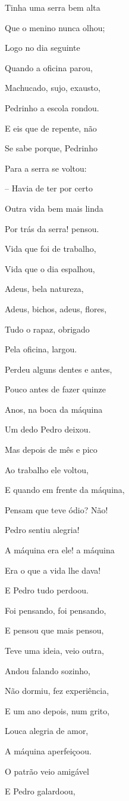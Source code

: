 Tinha uma serra bem alta

Que o menino nunca olhou;

Logo no dia seguinte

Quando a oficina parou,

Machucado, sujo, exausto,

Pedrinho a escola rondou.

E eis que de repente, não

Se sabe porque, Pedrinho

Para a serra se voltou:

-- Havia de ter por certo

Outra vida bem mais linda

Por trás da serra! pensou.

Vida que foi de trabalho,

Vida que o dia espalhou,

Adeus, bela natureza,

Adeus, bichos, adeus, flores,

Tudo o rapaz, obrigado

Pela oficina, largou.

Perdeu alguns dentes e antes,

Pouco antes de fazer quinze

Anos, na boca da máquina

Um dedo Pedro deixou.

Mas depois de mês e pico

Ao trabalho ele voltou,

E quando em frente da máquina,

Pensam que teve ódio? Não!

Pedro sentiu alegria!

A máquina era ele! a máquina

Era o que a vida lhe dava!

E Pedro tudo perdoou.

Foi pensando, foi pensando,

E pensou que mais pensou,

Teve uma ideia, veio outra,

Andou falando sozinho,

Não dormiu, fez experiência,

E um ano depois, num grito,

Louca alegria de amor,

A máquina aperfeiçoou.

O patrão veio amigável

E Pedro galardoou,

